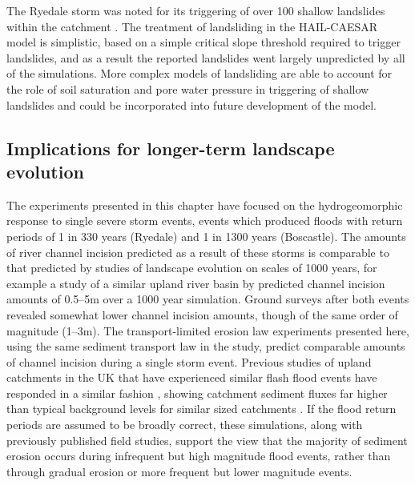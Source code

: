 The Ryedale storm was noted for its triggering of over 100 shallow landslides within the catchment \citep{galiatsatos2007assessment,dong2006evaluation,
wass2008investigation}. The treatment of landsliding in the HAIL-CAESAR model is simplistic, based on a simple critical slope threshold required to trigger landslides, and as a result the reported landslides went largely unpredicted by all of the simulations. More complex models of landsliding are able to account for the role of soil saturation and pore water pressure in triggering of shallow landslides \citep[e.g.][]{iverson2000landslide,crosta2003distributed} and could be incorporated into future development of the model. 

\subsection{Implications for longer-term landscape evolution}
The experiments presented in this chapter have focused on the hydrogeomorphic response to single severe storm events, events which produced floods with return periods of 1 in 330 years (Ryedale) and 1 in 1300 years (Boscastle). The amounts of river channel incision predicted as a result of these storms is comparable to that predicted by studies of landscape evolution on scales of 1000 years, for example a study of a similar upland river basin by \citep{coulthard2016sensitivity} predicted channel incision amounts of 0.5--5m over a 1000 year simulation. Ground surveys after both events \citep{wallingford2005flooding,dong2006evaluation} revealed somewhat lower channel incision amounts, though of the same order of magnitude (1--3m). The transport-limited erosion law experiments presented here, using the same sediment transport law in the \citet{coulthard2016sensitivity} study, predict comparable amounts of channel incision during a single storm event. Previous studies of upland catchments in the UK that have experienced similar flash flood events have responded in a similar fashion \citep{johnson2002flooding,milan2012geomorphic}, showing catchment sediment fluxes far higher than typical background levels for similar sized catchments \citep[e.g.][]{johnson2002annual}. If the flood return periods are assumed to be broadly correct, these simulations, along with previously published field studies, support the view that the majority of sediment erosion occurs during infrequent but high magnitude flood events, rather than through gradual erosion or more frequent but lower magnitude events.

               
